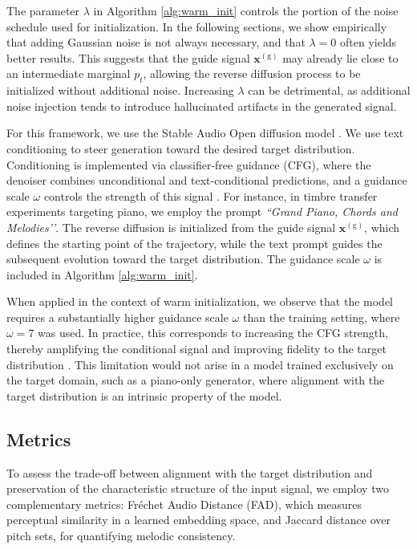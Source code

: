 The parameter $\lambda$ in Algorithm \ref{alg:warm_init} controls the portion of the noise schedule used for initialization. In the following sections, we show empirically that adding Gaussian noise is not always necessary, and that $\lambda = 0$ often yields better results. This suggests that the guide signal $\mathbf{x}^{(\mathrm g)}$ may already lie close to an intermediate marginal $p_t$, allowing the reverse diffusion process to be initialized without additional noise. Increasing $\lambda$ can be detrimental, as additional noise injection tends to introduce hallucinated artifacts in the generated signal.

For this framework, we use the Stable Audio Open diffusion model \cite{evans2024stableaudioopen}. We use text conditioning to steer generation toward the desired target distribution. Conditioning is implemented via classifier-free guidance (CFG), where the denoiser combines unconditional and text-conditional predictions, and a guidance scale $\omega$ controls the strength of this signal \cite{hoClassifierFreeDiffusionGuidance2022}. For instance, in timbre transfer experiments targeting piano, we employ the prompt \textit{``Grand Piano, Chords and Melodies’’}. The reverse diffusion is initialized from the guide signal $\mathbf{x}^{(\mathrm g)}$, which defines the starting point of the trajectory, while the text prompt guides the subsequent evolution toward the target distribution. The guidance scale $\omega$ is included in Algorithm \ref{alg:warm_init}.

When applied in the context of warm initialization, we observe that the model requires a substantially higher guidance scale $\omega$ than the training setting, where $\omega =7$ was used.  In practice, this corresponds to increasing the CFG strength, thereby amplifying the conditional signal and improving fidelity to the target distribution \cite{hoClassifierFreeDiffusionGuidance2022}. This limitation would not arise in a model trained exclusively on the target domain, such as a piano-only generator, where alignment with the target distribution is an intrinsic property of the model.

 \subsection{Metrics}
 \label{Metrics}
To assess the trade-off between alignment with the target distribution and preservation of the characteristic structure of the input signal, we employ two complementary metrics: Fréchet Audio Distance (FAD), which measures perceptual similarity in a learned embedding space, and Jaccard distance over pitch sets, for quantifying melodic consistency.

